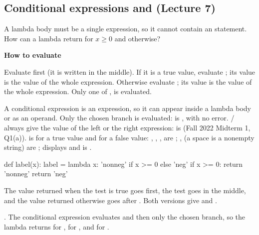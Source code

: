 \documentclass[10pt]{scrartcl}
\newenvironment{howto}[1]{\begin{mdframed}[style=howtostyle]{\color{NavyBlue}\textbf{#1}}\par\vspace{2pt}}{\end{mdframed}}
\begin{document}
\subsection{Conditional expressions and  (Lecture 7)}
\begin{qbox}
  A lambda body must be a single expression, so it cannot contain an  statement. How can a lambda return  for $x\ge0$ and  otherwise?
\end{qbox}
\begin{howto}{How to evaluate }
\begin{steps}
  \ii Evaluate  first (it is written in the middle).
  \ii If it is a true value, evaluate ; its value is the value of the whole expression.
  \ii Otherwise evaluate ; its value is the value of the whole expression. Only one of ,  is evaluated.
\end{steps}
\end{howto}
\begin{itemize}
  \ii A conditional expression is an expression, so it can appear inside a lambda body or as an operand.
  \ii Only the chosen branch is evaluated:  is , with no error.
  \ii {}/ always give the value of the left or the right expression:  is  (Fall 2022 Midterm 1, Q1(a)).
  \ii {} is  for a true value and  for a false value: , , ,  are ; ,  (a space is a nonempty string) are ;  displays  and is .
\end{itemize}
\begin{example*}
\begin{py}
def label(x):                      label = lambda x: 'nonneg' if x >= 0 else 'neg'
    if x >= 0:
        return 'nonneg'
    return 'neg'
\end{py}
The value returned when the test is true goes first, the test goes in the middle, and the value returned otherwise goes after . Both versions give  and .
\end{example*}
\revisit {}. The conditional expression evaluates  and then only the chosen branch, so the lambda returns  for ,  for , and  for .
\end{document}
